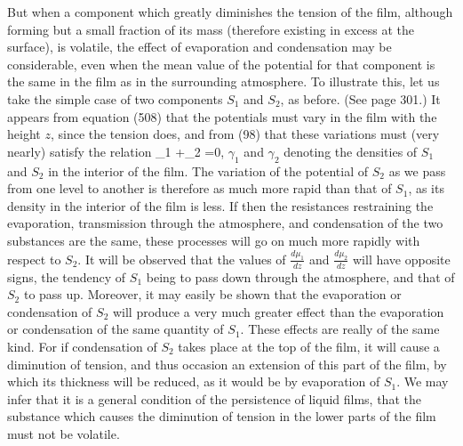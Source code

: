 \documentclass[12pt]{memoir}
\begin{document}
But when a component which greatly diminishes the tension of the film, although forming but a small fraction of its mass (therefore existing in excess at the surface), is volatile, the effect of evaporation and condensation may be considerable, even when the mean value of the potential for that component is the same in the film as in the surrounding atmosphere. To illustrate this, let us take the simple case of two components $S_1$ and $S_2$, as before. (See page 301.) It appears from equation (508) that the potentials must vary in the film with the height $z$, since the tension does, and from (98) that these variations must (very nearly) satisfy the relation
\eqs \gamma_1   +\gamma_2  =0,   \label{658} \eqe
$\gamma_1$ and $\gamma_2$ denoting the densities of $S_1$ and $S_2$ in the interior of the film. The variation of the potential of $S_2$ as we pass from one level to another is therefore as much more rapid than that of $S_1$, as its density in the interior of the film is less. If then the resistances restraining the evaporation, transmission through the atmosphere, and condensation of the two substances are the same, these processes will go on much more rapidly with respect to $S_2$. It will be observed that the values of $\frac{d\mu_1}{dz}$ and $\frac{d\mu_2}{dz}$ will have opposite signs, the tendency of $S_1$ being to pass down through the atmosphere, and that of $S_2$ to pass up. Moreover, it may easily be shown that the evaporation or condensation of $S_2$ will produce a very much greater effect than the evaporation or condensation of the same quantity of $S_1$. These effects are really of the same kind. For if condensation of $S_2$ takes place at the top of the film, it will cause a diminution of tension, and thus occasion an extension of this part of the film, by which its thickness will be reduced, as it would be by evaporation of $S_1$. We may infer that it is a general condition of the persistence of liquid films, that the substance which causes the diminution of tension in the lower parts of the film must not be volatile.
\end{document}

